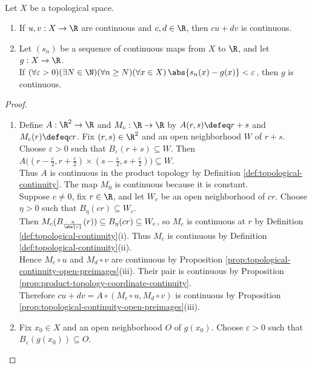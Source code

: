 \begin{proposition} \label{prop:topological-real-continuity-stability} \\
Let $X$ be a topological space.
\begin{enumerate}[label=(\roman*)]
\setlength{\itemsep}{0pt}
\item If $u,v:X\to\R$ are continuous and $c,d\in\R$, then $cu+dv$ is continuous.
\item Let $(s_n)$ be a sequence of continuous maps from $X$ to $\R$, and let $g:X\to\R$.\\
If $(\forall\varepsilon>0)(\exists N\in\N)(\forall n\geq N)(\forall x\in X)\,\abs{s_n(x)-g(x)}<\varepsilon$, then $g$ is continuous.
\end{enumerate}
\begin{proof}
\begin{enumerate}[label=(\roman*)]
\setlength{\itemsep}{0pt}
\item Define $A:\R^2\to\R$ and $M_c:\R\to\R$ by $A(r,s)\defeq r+s$ and $M_c(r)\defeq cr$. Fix $(r,s)\in\R^2$ and an open neighborhood $W$ of $r+s$.\\
Choose $\varepsilon>0$ such that $B_\varepsilon(r+s)\subseteq W$. Then $A\bigl((r-\frac{\varepsilon}{2},r+\frac{\varepsilon}{2})\times(s-\frac{\varepsilon}{2},s+\frac{\varepsilon}{2})\bigr)\subseteq W$.\\
Thus $A$ is continuous in the product topology by Definition \ref{def:topological-continuity}. The map $M_0$ is continuous because it is constant.\\
Suppose $c\neq0$, fix $r\in\R$, and let $W_c$ be an open neighborhood of $cr$. Choose $\eta>0$ such that $B_\eta(cr)\subseteq W_c$.\\
Then $M_c(B_{\frac{\eta}{\abs{c}}}(r))\subseteq B_\eta(cr)\subseteq W_c$, so $M_c$ is continuous at $r$ by Definition \ref{def:topological-continuity}(i). Thus $M_c$ is continuous by Definition \ref{def:topological-continuity}(ii).\\
Hence $M_c\circ u$ and $M_d\circ v$ are continuous by Proposition \ref{prop:topological-continuity-open-preimages}(iii). Their pair is continuous by Proposition \ref{prop:product-topology-coordinate-continuity}.\\
Therefore $cu+dv=A\circ(M_c\circ u,M_d\circ v)$ is continuous by Proposition \ref{prop:topological-continuity-open-preimages}(iii).
\item Fix $x_0\in X$ and an open neighborhood $O$ of $g(x_0)$. Choose $\varepsilon>0$ such that $B_\varepsilon(g(x_0))\subseteq O$.\\

\end{enumerate}
\end{proof}
\end{proposition}
